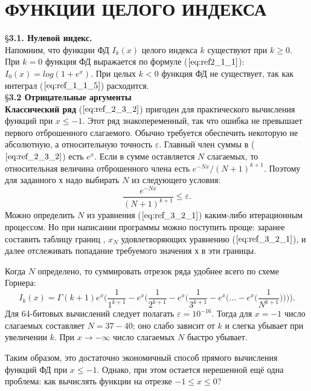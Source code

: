 \chapter{ФУНКЦИИ ЦЕЛОГО ИНДЕКСА}

\S \textbf{3.1. Нулевой индекс.}
\\

Напомним, что функции ФД $I_k(x)$ целого индекса $k$ существуют при $k \geqslant 0$. При $k = 0$ функция ФД выражается по формуле ($\ref{eq:ref2_1_1}$): $I_0(x)=log(1+e^x).$ При целых $k < 0$ функция ФД не существует, так как интеграл ($\ref{eq:ref_1_1_5}$) расходится.
\\

\S \textbf{3.2 Отрицательные аргументы}
\\

\textbf{Классический ряд} ($\ref{eq:ref_2_3_2}$) пригоден для практического вычисления функций
при $x \leqslant -1$. Этот ряд знакопеременный, так что ошибка не превышает первого
отброшенного слагаемого. Обычно требуется обеспечить некоторую не
абсолютную, а относительную точность $\varepsilon$. Главный член суммы в ($\ref{eq:ref_2_3_2}$) есть $e^{x}$.
Если в сумме оставляется $N$ слагаемых, то относительная величина
отброшенного члена есть $e^{-Nx}/(N+1)^{k+1}$. Поэтому для заданного $х$ надо
выбирать $N$ из следующего условия:
\begin{equation}
\frac{e^{-Nx}}{(N+1)^{k+1}} \leqslant \varepsilon.
\label{eq:ref_3_2_1}
\end{equation}
Можно определить $N$ из уравнения ($\ref{eq:ref_3_2_1}$) каким-либо итерационным
процессом. Но при написании программы можно поступить проще: заранее
составить таблицу границ , $x_{N}$ удовлетворяющих уравнению ($\ref{eq:ref_3_2_1}$), и далее
отслеживать попадание требуемого значения $х$ в эти границы.

Когда $N$ определено, то суммировать отрезок ряда удобнее всего по схеме Горнера:
\begin{equation}
I_k(x)=\Gamma(k+1)e^{x}\Bigg(\frac{1}{1^{k+1}}-e^{x}\Bigg(\frac{1}{2^{k+1}}-e^{x}\Bigg(\frac{1}{3^{k+1}}-e^{x}\Bigg(...-e^{x}\Bigg(\frac{1}{N^{k+1}}\Bigg)\Bigg)\Bigg)\Bigg).
\label{eq:ref_3_2_2}
\end{equation}
Для 64-битовых вычислений следует полагать  $\varepsilon = 10^{-16}$. Тогда для $x = -1$
число слагаемых составляет $N = 37 - 40$; оно слабо зависит от $k$ и слегка
убывает при увеличении $k$. При $x \to -\infty$ число слагаемых $N$ быстро убывает.

Таким образом, это достаточно экономичный способ прямого вычисления функций ФД при $x \leqslant -1$. Однако, при этом остается нерешенной ещё одна проблема: как вычислять функции на отрезке $-1 \leqslant x \leqslant 0$?

